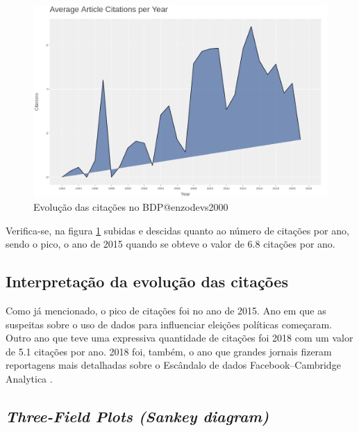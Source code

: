 \begin{figure}
    \centering
    \includegraphics[width=1\textwidth]{experiments/enzodevs2000/AnaliseBibliometrica/BigDataInPolicy/Graficos/citations-evolution.png}
    \caption{Evolução das citações no \dataset BDP@enzodevs2000}
    \label{fig:enzodevs2000:BDP:evol_citation}
\end{figure}

Verifica-se, na figura \ref{fig:enzodevs2000:BDP:evol_citation} subidas e descidas quanto ao número de citações por ano, sendo o pico, o ano de 2015 quando se obteve o valor de 6.8 citações por ano.

\subsection{Interpretação da evolução das citações}

Como já mencionado, o pico de citações foi no ano de 2015. Ano em que as suspeitas sobre o uso de dados para influenciar eleições políticas começaram. Outro ano que teve uma expressiva quantidade de citações foi 2018 com um valor de 5.1 citações por ano. 2018 foi, também, o ano que grandes jornais fizeram reportagens mais detalhadas sobre o Escândalo de dados Facebook–Cambridge Analytica \citep{wikipedia_escandalo_nodate}.

\subsection{\textit{Three-Field Plots (Sankey diagram)}}

